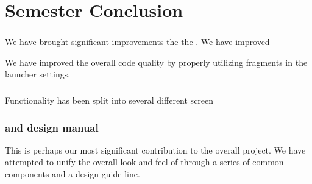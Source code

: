 \chapter{Semester Conclusion}
\label{cha:conclusion_final}

\subsection{\launcher}
We have brought significant improvements the the \launcher. We have improved 


We have improved the overall code quality by properly utilizing fragments in the launcher settings.   

\subsection{\ct}

Functionality has been split into several different screen

\subsection{\gc and design manual}

This is perhaps our most significant contribution to the overall project. We have attempted to unify the overall look and feel of \giraf through a series of common components and a design guide line. 